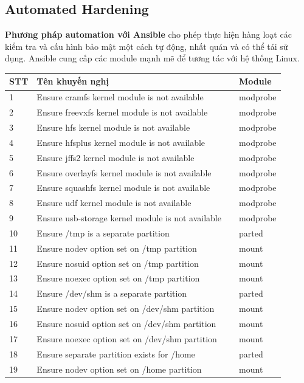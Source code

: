 \subsection{Automated Hardening}
\noindent \textbf{Phương pháp automation với Ansible} cho phép thực hiện hàng loạt các kiểm tra và cấu hình bảo mật một cách tự động, nhất quán và có thể tái sử dụng. Ansible cung cấp các module mạnh mẽ để tương tác với hệ thống Linux.

\begin{longtable}{|p{0.05\linewidth}|p{0.75\linewidth}|p{0.1\linewidth}|}
\hline
\textbf{STT} & \textbf{Tên khuyến nghị} & \textbf{Module} \\
\hline
\endhead
1 & Ensure cramfs kernel module is not available & modprobe \\
2 & Ensure freevxfs kernel module is not available & modprobe \\
3 & Ensure hfs kernel module is not available & modprobe \\
4 & Ensure hfsplus kernel module is not available & modprobe \\
5 & Ensure jffs2 kernel module is not available & modprobe \\
6 & Ensure overlayfs kernel module is not available & modprobe \\
7 & Ensure squashfs kernel module is not available & modprobe \\
8 & Ensure udf kernel module is not available & modprobe \\
9 & Ensure usb-storage kernel module is not available & modprobe \\
10 & Ensure /tmp is a separate partition & parted \\
11 & Ensure nodev option set on /tmp partition & mount \\
12 & Ensure nosuid option set on /tmp partition & mount \\
13 & Ensure noexec option set on /tmp partition & mount \\
14 & Ensure /dev/shm is a separate partition & parted \\
15 & Ensure nodev option set on /dev/shm partition & mount \\
16 & Ensure nosuid option set on /dev/shm partition & mount \\
17 & Ensure noexec option set on /dev/shm partition & mount \\
18 & Ensure separate partition exists for /home & parted \\
19 & Ensure nodev option set on /home partition & mount \\

\end{longtable}
